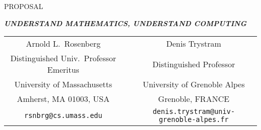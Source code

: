\documentclass{article}[12pt]
\begin{document}
\begin{center}
PROPOSAL 

\bigskip

{\large\bf\em UNDERSTAND MATHEMATICS, UNDERSTAND COMPUTING}
\end{center}

\begin{center}
\begin{tabular}{ccc}
{\large Arnold L.~Rosenberg} & & {\large Denis Trystram} \\
Distinguished Univ.~Professor Emeritus
  & & Distinguished Professor \\
University of Massachusetts  & & University of Grenoble Alpes \\
Amherst, MA 01003, USA       & & Grenoble, FRANCE \\
{\small\tt rsnbrg@cs.umass.edu} & & {\small\tt denis.trystram@univ-grenoble-alpes.fr}
\end{tabular}
\end{center}

\bigskip
\end{document}
